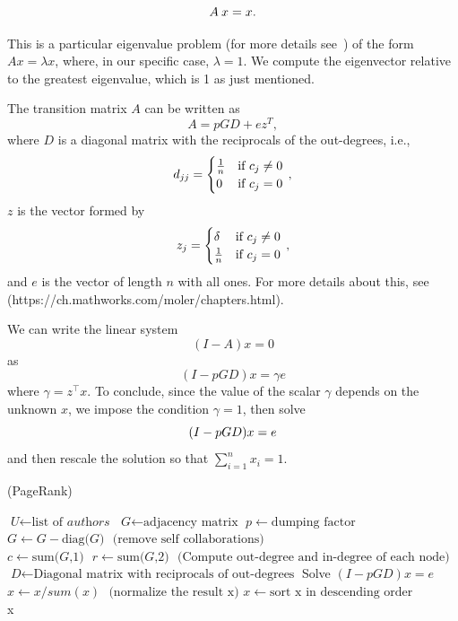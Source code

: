\documentclass[]{usiinfbachelorproject}
\newcommand\transp[1]{{#1}^{\top}}
\begin{document}
\begin{equation}\notag
A\:x = x \text{.}
\end{equation}

This is a particular eigenvalue problem (for more details see~\cite[Chapter 8]{eigs}) of the form $Ax=\lambda x$, where, in our specific case, $\lambda = 1$. We compute the eigenvector relative to the greatest eigenvalue, which is 1 as just mentioned.

The transition matrix $A$ can be written as
$$A = pGD+ez^{T}, $$
where $D$ is a diagonal matrix with the reciprocals of the out-degrees, i.e.,
\begin{equation}\notag
d_{jj} = 
\begin{cases}
\frac{1}{n} & \text{if } c_{j} \neq 0\\
0 & \text{if } c_{j} = 0
\end{cases} \,,
\end{equation}
$z$ is the vector formed by
\begin{equation}\notag
z_{j} = 
\begin{cases}
\delta & \text{if } c_{j} \neq 0\\
\frac{1}{n} & \text{if } c_{j} = 0
\end{cases} \,,
\end{equation}
and $e$ is the vector of length $n$ with all ones. For more details about this, see~\cite[Chapter 7]{molerPR} (https://ch.mathworks.com/moler/chapters.html).

We can write the linear system
$$(I-A)x=0$$
as
$$(I - pGD)x = \gamma e$$
where $\gamma = \transp{z}x$.
To conclude, since the value of the scalar $\gamma$ depends on the unknown $x$, we impose the condition $\gamma = 1$, then solve
\begin{equation}\notag
(I - pGD)x = e
\end{equation}
and then rescale the solution so that $\sum\limits_{i=1}^{n} x_i = 1$.

\begin{algorithm}
\caption{ (PageRank)}\label{pagerank}
\begin{algorithmic}[1]
\State $\textit{U} \gets \text{list of }\textit{authors}$
\State $\textit{G} \gets \text{adjacency matrix}$
\State $p \gets \text{dumping factor}$
\State $\textit{G} \gets \textit{G} - \text{diag(}\textit{G}\text{)} \: \: \: \text{(remove self collaborations)}$
\State $\textit{c} \gets \text{sum(}\textit{G}\text{,1)} \:\:\: \textit{r} \gets \text{sum(}\textit{G}\text{,2)} \:\:\: \text{(Compute out-degree and in-degree of each node)}$
\State $\textit{D} \gets \text{Diagonal matrix with reciprocals of out-degrees}$
\State Solve $(I - pGD)x = e$
\State $x \gets x / sum(x) \: \:\: \text{(normalize the result x)}$
\State $x \gets \text{sort x in descending order}$\\
\Return x
\EndProcedure
\end{algorithmic}
\end{algorithm}
\end{document}
